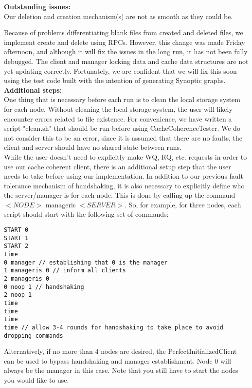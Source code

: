\documentclass[11pt]{article}
\begin{document}
\textbf{Outstanding issues:} \\

Our deletion and creation mechanism(s) are not as smooth as they could be.

Because of problems differentiating blank files from created and deleted files, we implement create and delete using RPCs.
However, this change was made Friday afternoon, and although it will fix the issues in the long run, it has not been fully debugged.
The client and manager locking data and cache data structures are not yet updating correctly.
Fortunately, we are confident that we will fix this soon using the test code built with the intention of generating Synoptic graphs. \\

\textbf{Additional steps:} \\

One thing that is necessary before each run is to clean the local storage system for each node. Without cleaning the local storage system, the user will likely encounter errors related to file existence. For convenience, we have written a script "clean.sh" that should be run before using CacheCoherenceTester. We do not consider this to be an error, since it is assumed that there are no faults, the client and server should have no shared state between runs. \\

While the user doesn’t need to explicitly make WQ, RQ, etc. requests in order to use our cache coherent client, there is an additional setup step 
that the user needs to take before using our implementation. In addition to our previous fault tolerance mechanism of handshaking, it is also necessary 
to explicitly define who the server/manager is for each node. This is done by calling up the command $<NODE>$ manageris $<SERVER>$. So, for example, for three 
nodes, each script should start with the following set of commands:\\

\begin{verbatim}
START 0
START 1
START 2
time
0 manager // establishing that 0 is the manager
1 manageris 0 // inform all clients
2 manageris 0
0 noop 1 // handshaking
2 noop 1
time
time
time
time // allow 3-4 rounds for handshaking to take place to avoid dropping commands
\end{verbatim}

Alternatively, if no more than 4 nodes are desired, the PerfectInitializedClient can be used to bypass handshaking and manager establishment.
Node 0 will always be the manager in this case. Note that you still have to start the nodes you would like to use. \\
\end{document}
